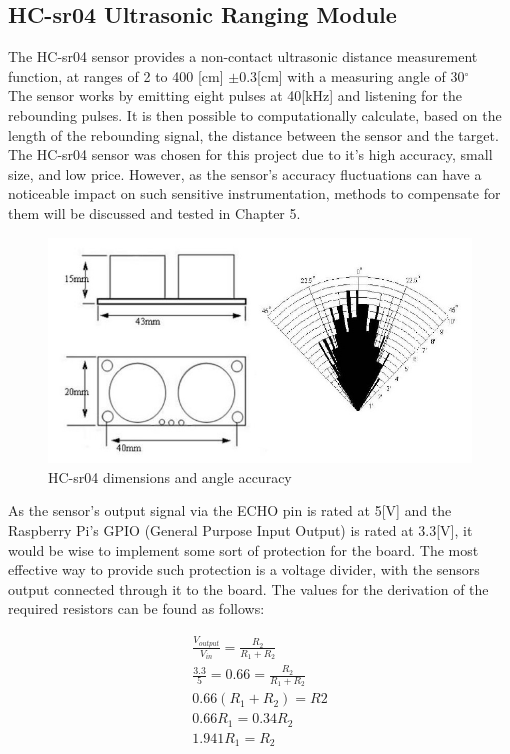\documentclass[twoside]{ctuthesis}
\theoremstyle{plain}
\theoremstyle{definition}
\theoremstyle{note}
\begin{document}
\subsection{HC-sr04 Ultrasonic Ranging Module}
The HC-sr04 sensor provides a non-contact ultrasonic distance measurement function, at ranges of 2 to 400 [cm] $\pm$0.3[cm] with a measuring angle of 30$^\circ$\\
The sensor works by emitting eight pulses at 40[kHz] and listening for the rebounding pulses. It is then possible to computationally calculate, based on the length of the rebounding signal, the distance between the sensor and the target.\\
The HC-sr04 sensor was chosen for this project due to it's high accuracy, small size, and low price. However, as the sensor's accuracy fluctuations can have a noticeable impact on such sensitive instrumentation, methods to compensate for them will be discussed and tested in Chapter 5.\\

\begin{figure}[H]
	\centering
	\includegraphics[scale=0.5]{HCSR04_sizes}
	\caption{HC-sr04 dimensions and angle accuracy \cite{HC-SR04}}
\end{figure}

As the sensor's output signal via the ECHO pin is rated at 5[V] \cite{HC-SR04} and the Raspberry Pi's GPIO (General Purpose Input Output) is rated at 3.3[V]\cite{RasPi0W}, it would be wise to implement some sort of protection for the board. The most effective way to provide such protection is a voltage divider, with the sensors output connected through it to the board. The values for the derivation of the required resistors can be found as follows:

\begin{gather}\nonumber
	\frac{V_{output}}{V_{in}} = \frac{R_2}{R_1 + R_2}\\\nonumber
	\frac{3.3}{5}= 0.66 = \frac{R_2}{R_1 + R_2}\\\nonumber
	0.66(R_1+R_2) = R2\\\nonumber
	0.66R_1 = 0.34R_2\\
	1.941R_1 = R_2
\end{gather}
\end{document}
